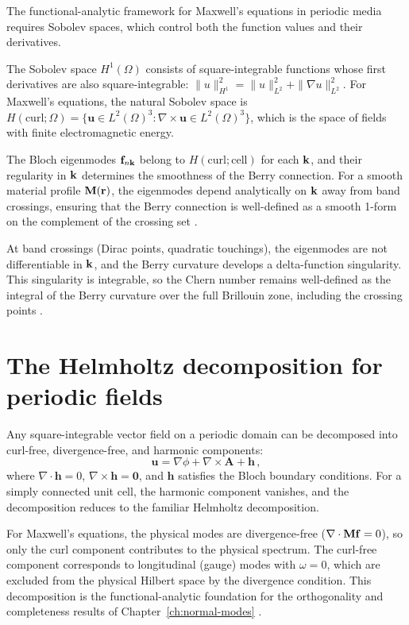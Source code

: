 The functional-analytic framework for Maxwell's equations in periodic
media requires Sobolev spaces, which control both the function values
and their derivatives.

The Sobolev space $H^1(\Omega)$ consists of square-integrable
functions whose first derivatives are also square-integrable:
$\|u\|_{H^1}^2=\|u\|_{L^2}^2+\|\nabla u\|_{L^2}^2$.  For
Maxwell's equations, the natural Sobolev space is
$H(\mathrm{curl};\Omega)=\{\mathbf{u}\in L^2(\Omega)^3:
\nabla\times\mathbf{u}\in L^2(\Omega)^3\}$, which is the space of
fields with finite electromagnetic energy.

The Bloch eigenmodes $\mathbf{f}_{n\mathbf{k}}$ belong to
$H(\mathrm{curl};\mathrm{cell})$ for each $\mathbf{k}$, and their
regularity in $\mathbf{k}$ determines the smoothness of the Berry
connection.  For a smooth material profile $\mathbf{M}(\mathbf{r})$, the
eigenmodes depend analytically on $\mathbf{k}$ away from band crossings,
ensuring that the Berry connection is well-defined as a smooth
1-form on the complement of the crossing set
\cite{gangaraj2016berry,silveirinha2016bulk}.

At band crossings (Dirac points, quadratic touchings), the eigenmodes
are not differentiable in $\mathbf{k}$, and the Berry curvature develops a
delta-function singularity.  This singularity is integrable, so the
Chern number remains well-defined as the integral of the Berry
curvature over the full Brillouin zone, including the crossing points
\cite{ozawa2018topological}.

\section{The Helmholtz decomposition for periodic fields}
\label{sec:appA-helmholtz}

Any square-integrable vector field on a periodic domain can be
decomposed into curl-free, divergence-free, and harmonic components:
\begin{equation}\label{eq:appA-helmholtz}
  \mathbf{u} = \nabla\phi + \nabla\times\mathbf{A} + \mathbf{h}\,,
\end{equation}
where $\nabla\cdot\mathbf{h}=0$, $\nabla\times\mathbf{h}=\mathbf{0}$,
and $\mathbf{h}$ satisfies the Bloch boundary conditions.  For a
simply connected unit cell, the harmonic component vanishes, and the
decomposition reduces to the familiar Helmholtz decomposition.

For Maxwell's equations, the physical modes are divergence-free
($\nabla\cdot\mathbf{M}\mathbf{f}=0$), so only the curl component
contributes to the physical spectrum.  The curl-free component
corresponds to longitudinal (gauge) modes with $\omega=0$, which are
excluded from the physical Hilbert space by the divergence condition.
This decomposition is the functional-analytic foundation for the
orthogonality and completeness results of
Chapter~\ref{ch:normal-modes} \cite{silveirinha2016bulk}.


